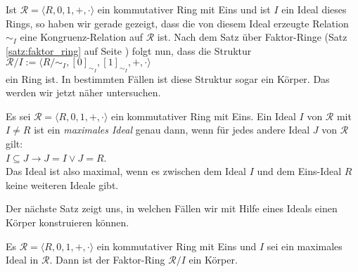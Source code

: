 Ist $\mathcal{R} = \langle R, 0, 1, +, \cdot \rangle$ ein kommutativer Ring mit Eins und ist $I$ ein
Ideal dieses Rings, so haben wir gerade gezeigt, dass die von diesem Ideal erzeugte Relation $\sim_I$
eine Kongruenz-Relation auf $\mathcal{R}$ ist.  Nach dem Satz \"{u}ber Faktor-Ringe
(Satz \ref{satz:faktor_ring} auf Seite \pageref{satz:faktor_ring}) folgt nun, dass die Struktur
\\[0.2cm]
\hspace*{1.3cm}
 $\mathcal{R}/I := \langle R/\!\sim_I, [0]_{\sim_I}, [1]_{\sim_I}, +, \cdot \rangle$
\\[0.2cm]
ein Ring ist.  In bestimmten F\"{a}llen ist diese Struktur sogar ein K\"{o}rper.  Das werden wir jetzt n\"{a}her
untersuchen.

\begin{Definition}
  Es sei $\mathcal{R} = \langle R, 0, 1, +, \cdot \rangle$ ein kommutativer Ring mit Eins.  Ein Ideal
  $I$ von $\mathcal{R}$ mit $I \not= R$ ist ein {\color{blue}\emph{maximales Ideal}} genau dann, wenn f\"{u}r jedes andere Ideal
  $J$ von $\mathcal{R}$ gilt:
  \\[0.2cm]
  \hspace*{1.3cm}
  $I \subseteq J \rightarrow J = I \vee J = R$.
  \\[0.2cm]
  Das Ideal ist also maximal, wenn es zwischen dem Ideal $I$ und dem Eins-Ideal $R$ keine 
  weiteren Ideale gibt.
  \eox
\end{Definition}

Der n\"{a}chste Satz zeigt uns, in welchen F\"{a}llen wir mit Hilfe eines Ideals einen K\"{o}rper konstruieren
k\"{o}nnen. 
\begin{Satz} \lb
  Es $\mathcal{R} = \langle R, 0, 1, +, \cdot \rangle$ ein kommutativer Ring mit Eins und
  $I$ sei ein maximales Ideal in $\mathcal{R}$.  Dann ist der Faktor-Ring
  $\mathcal{R}/I$ ein K\"{o}rper.
\end{Satz}

